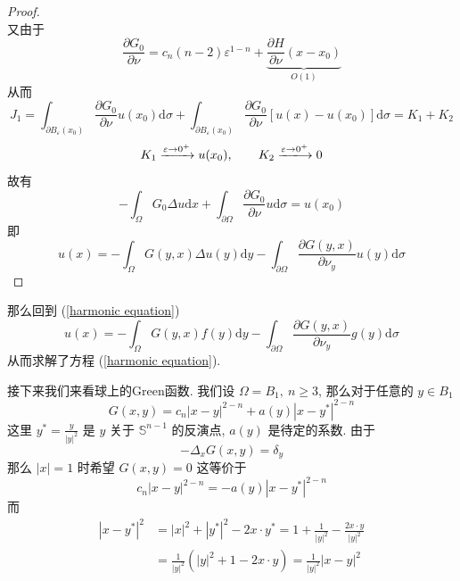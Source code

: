 \documentclass[11pt]{ctexart}[UTF8]
\begin{document}
\begin{proof}
\begin{equation*}
    \end{equation*}
    又由于
    \begin{equation*}
        \frac{\partial G_{0}}{\partial \nu} = c_{n}(n-2)\varepsilon^{1-n} + \underbrace{\frac{\partial H}{\partial \nu}(x-x_{0})}_{O(1)}
    \end{equation*}
    从而
    \begin{equation*}
        J_{1} = \int_{\partial B_{\varepsilon}(x_{0})} \frac{\partial G_{0}}{\partial \nu} u(x_{0}) \mathrm{d}\sigma + \int_{\partial B_{\varepsilon}(x_{0})} \frac{\partial G_{0}}{\partial \nu} [u(x) - u(x_{0})] \mathrm{d}\sigma = K_{1} + K_{2}
    \end{equation*}
    \begin{equation*}
        K_{1} \xrightarrow{\varepsilon \to 0^+} u(x_{0}),\quad\quad K_{2} \xlongrightarrow{\varepsilon \to 0^+}0
    \end{equation*}
    故有
    \begin{equation*}
        -\int_{\Omega} G_{0} \Delta u \mathrm{d}x + \int_{\partial\Omega} \frac{\partial G_{0}}{\partial \nu} u \mathrm{d}\sigma = u(x_{0})
    \end{equation*}
    即
    \begin{equation*}
        u(x) = -\int_{\Omega} G(y,x) \Delta u(y) \mathrm{d}y - \int_{\partial\Omega} \frac{\partial G(y,x)}{\partial \nu_{y}} u(y) \mathrm{d}\sigma
    \end{equation*}
\end{proof}
那么回到 (\ref{harmonic equation})
\begin{equation}
    u(x) = -\int_{\Omega} G(y,x) f(y) \mathrm{d}y - \int_{\partial\Omega} \frac{\partial G(y,x)}{\partial \nu_{y}} g(y) \mathrm{d}\sigma
\end{equation}
从而求解了方程 (\ref{harmonic equation}).\par
接下来我们来看球上的Green函数. 我们设 $\Omega = B_{1},\ n\geq 3$, 那么对于任意的 $y \in B_{1}$
\begin{equation*}
    G(x,y) = c_{n}|x-y|^{2-n} + a(y)|x-y^{*}|^{2-n}
\end{equation*}
这里 $y^{*} = \frac{y}{|y|^2}$ 是 $y$ 关于 $\mathbb{S}^{n-1}$ 的反演点, $a(y)$ 是待定的系数. 由于
\begin{equation*}
    -\Delta_{x} G(x,y) = \delta_{y}
\end{equation*}
那么 $|x| = 1$ 时希望 $G(x,y) = 0$ 这等价于 $$c_{n}|x-y|^{2-n} =- a(y)|x-y^{*}|^{2-n}$$
而
\begin{equation*}
    \begin{aligned}
        |x-y^{*}|^2 &= |x|^2 + |y^{*}|^2 - 2x \cdot y^{*} = 1 + \frac{1}{|y|^2} - \frac{2x \cdot y}{|y|^2} \\
                    &= \frac{1}{|y|^2}(|y|^2 + 1 - 2x \cdot y) = \frac{1}{|y|^2} |x-y|^2
    \end{aligned}
\end{equation*}
\end{document}

